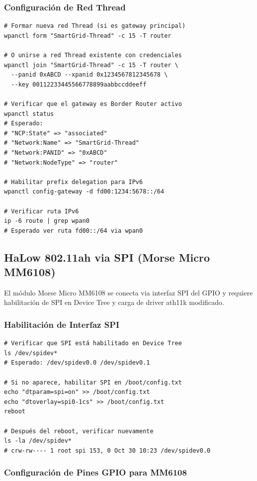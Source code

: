 \subsubsection{Configuración de Red Thread}

\begin{verbatim}
# Formar nueva red Thread (si es gateway principal)
wpanctl form "SmartGrid-Thread" -c 15 -T router

# O unirse a red Thread existente con credenciales
wpanctl join "SmartGrid-Thread" -c 15 -T router \
  --panid 0xABCD --xpanid 0x1234567812345678 \
  --key 00112233445566778899aabbccddeeff

# Verificar que el gateway es Border Router activo
wpanctl status
# Esperado:
# "NCP:State" => "associated"
# "Network:Name" => "SmartGrid-Thread"
# "Network:PANID" => "0xABCD"
# "Network:NodeType" => "router"

# Habilitar prefix delegation para IPv6
wpanctl config-gateway -d fd00:1234:5678::/64

# Verificar ruta IPv6
ip -6 route | grep wpan0
# Esperado ver ruta fd00::/64 via wpan0
\end{verbatim}

\subsection{HaLow 802.11ah via SPI (Morse Micro MM6108)}

El módulo Morse Micro MM6108 se conecta via interfaz SPI del GPIO y requiere habilitación de SPI en Device Tree y carga de driver ath11k modificado.

\subsubsection{Habilitación de Interfaz SPI}

\begin{verbatim}
# Verificar que SPI está habilitado en Device Tree
ls /dev/spidev*
# Esperado: /dev/spidev0.0 /dev/spidev0.1

# Si no aparece, habilitar SPI en /boot/config.txt
echo "dtparam=spi=on" >> /boot/config.txt
echo "dtoverlay=spi0-1cs" >> /boot/config.txt
reboot

# Después del reboot, verificar nuevamente
ls -la /dev/spidev*
# crw-rw---- 1 root spi 153, 0 Oct 30 10:23 /dev/spidev0.0
\end{verbatim}

\subsubsection{Configuración de Pines GPIO para MM6108}

